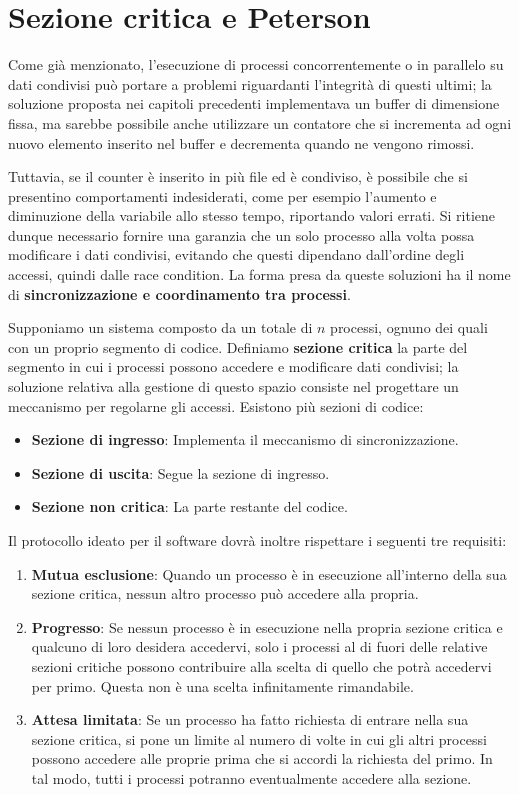 \section{Sezione critica e Peterson}
Come già menzionato, l'esecuzione di processi concorrentemente o in parallelo su dati condivisi può portare a problemi riguardanti l'integrità di questi
ultimi; la soluzione proposta nei capitoli precedenti implementava un buffer di dimensione fissa, ma sarebbe possibile anche utilizzare un contatore
che si incrementa ad ogni nuovo elemento inserito nel buffer e decrementa quando ne vengono rimossi.\par
Tuttavia, se il counter è inserito in più file ed è condiviso, è possibile che si presentino comportamenti indesiderati, come per esempio l'aumento e
diminuzione della variabile allo stesso tempo, riportando valori errati. Si ritiene dunque necessario fornire una garanzia che un solo processo alla
volta possa modificare i dati condivisi, evitando che questi dipendano dall'ordine degli accessi, quindi dalle race condition. La forma presa da queste
soluzioni ha il nome di \textbf{sincronizzazione e coordinamento tra processi}.\newline

\noindent Supponiamo un sistema composto da un totale di $n$ processi, ognuno dei quali con un proprio segmento di codice. Definiamo
\textbf{sezione critica} la parte del segmento in cui i processi possono accedere e modificare dati condivisi; la soluzione relativa alla gestione di
questo spazio consiste nel progettare un meccanismo per regolarne gli accessi. Esistono più sezioni di codice: \begin{itemize}
    \item \textbf{Sezione di ingresso}: Implementa il meccanismo di sincronizzazione.
    \item \textbf{Sezione di uscita}: Segue la sezione di ingresso.
    \item \textbf{Sezione non critica}: La parte restante del codice.
\end{itemize}

\noindent Il protocollo ideato per il software dovrà inoltre rispettare i seguenti tre requisiti: \begin{enumerate}
    \item \textbf{Mutua esclusione}: Quando un processo è in esecuzione all'interno della sua sezione critica, nessun altro processo può accedere alla
    propria.
    \item \textbf{Progresso}: Se nessun processo è in esecuzione nella propria sezione critica e qualcuno di loro desidera accedervi, solo i processi al
    di fuori delle relative sezioni critiche possono contribuire alla scelta di quello che potrà accedervi per primo. Questa non è una scelta
    infinitamente rimandabile.
    \item \textbf{Attesa limitata}: Se un processo ha fatto richiesta di entrare nella sua sezione critica, si pone un limite al numero di volte in cui
    gli altri processi possono accedere alle proprie prima che si accordi la richiesta del primo. In tal modo, tutti i processi potranno eventualmente
    accedere alla sezione.
\end{enumerate}


